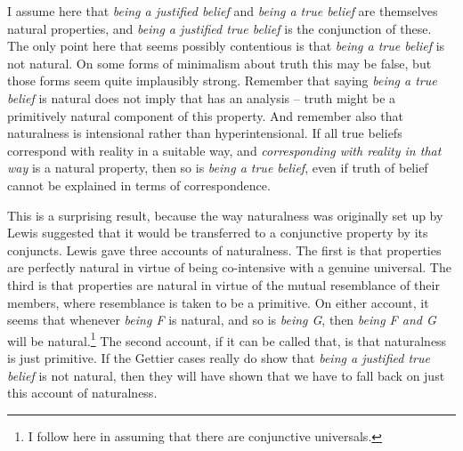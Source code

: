 I assume here that \textit{being a justified belief} and \textit{being a true belief} are themselves natural properties, and \textit{being a justified true belief} is the conjunction of these. The only point here that seems possibly contentious is that \textit{being a true belief} is not natural. On some forms of minimalism about truth this may be false, but those forms seem quite implausibly strong. Remember that saying \textit{being a true belief} is natural does not imply that has an analysis -- truth might be a primitively natural component of this property. And remember also that naturalness is intensional rather than hyperintensional. If all true beliefs correspond with reality in a suitable way, and \textit{corresponding with reality in that way }is a natural property, then so is \textit{being a true belief}, even if truth of belief cannot be explained in terms of correspondence.

This is a surprising result, because the way naturalness was originally set up by Lewis suggested that it would be transferred to a conjunctive property by its conjuncts. Lewis gave three accounts of naturalness. The first is that properties are perfectly natural in virtue of being co-intensive with a genuine universal. The third is that properties are natural in virtue of the mutual resemblance of their members, where resemblance is taken to be a primitive. On either account, it seems that whenever \textit{being F} is natural, and so is \textit{being G}, then \textit{being F and G} will be natural.\footnote{I follow \citet{Armstrong1978-Universals} here in assuming that there are conjunctive universals.} The second account, if it can be called that, is that naturalness is just primitive. If the Gettier cases really do show that \textit{being a justified true belief} is not natural, then they will have shown that we have to fall back on just this account of naturalness.

%





